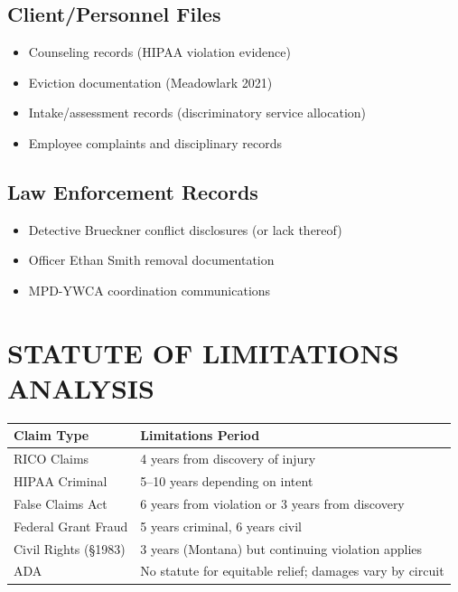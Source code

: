 \documentclass[11pt,letterpaper]{article}
\begin{document}
\subsection{Client/Personnel Files}
\begin{itemize}[leftmargin=*]
\item Counseling records (HIPAA violation evidence)
\item Eviction documentation (Meadowlark 2021)
\item Intake/assessment records (discriminatory service allocation)
\item Employee complaints and disciplinary records
\end{itemize}

\subsection{Law Enforcement Records}
\begin{itemize}[leftmargin=*]
\item Detective Brueckner conflict disclosures (or lack thereof)
\item Officer Ethan Smith removal documentation
\item MPD-YWCA coordination communications
\end{itemize}

\newpage

\section{STATUTE OF LIMITATIONS ANALYSIS}

\begin{table}[H]
\centering
\begin{tabular}{ll}
\toprule
\textbf{Claim Type} & \textbf{Limitations Period}\\
\midrule
RICO Claims & 4 years from discovery of injury\\
HIPAA Criminal & 5--10 years depending on intent\\
False Claims Act & 6 years from violation or 3 years from discovery\\
Federal Grant Fraud & 5 years criminal, 6 years civil\\
Civil Rights (\S1983) & 3 years (Montana) but continuing violation applies\\
ADA & No statute for equitable relief; damages vary by circuit\\
\bottomrule
\end{tabular}
\end{table}
\end{document}
